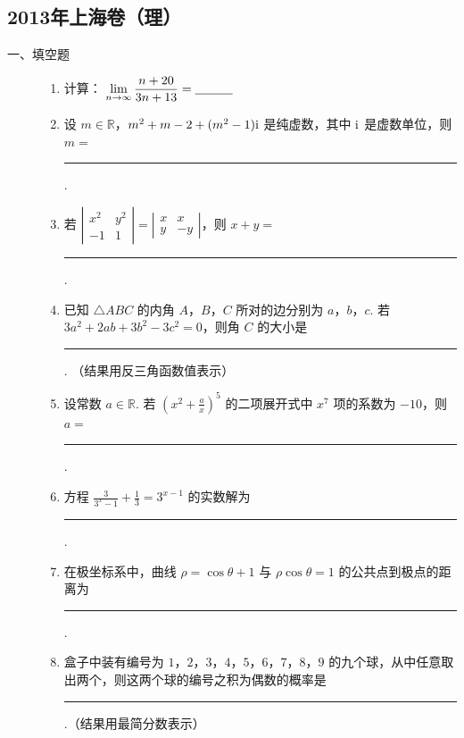 \subsection{2013年上海卷（理）}\label{gk:2013年上海卷（理）}

\begin{description}

    \item[一、填空题]

    \begin{enumerate}[leftmargin=5pt]

        \item 计算： \(\displaystyle\lim_{n\to\infty}\frac{n+20}{3n+13}=\rule[-0.3ex]{3em}{0.4pt}\)

        \item 设 \(m \in \mathbb{R}\)，\(m^2 + m - 2 + (m^2 - 1)\mathrm{i}\) 是纯虚数，其中 \(\mathrm{i}\) 是虚数单位，则 \(m=\)\rule[-0.3ex]{3em}{0.4pt}.

        \item 若 \(\left|\begin{matrix}x^2 & y^2 \\ -1 & 1\end{matrix}\right| = \left|\begin{matrix}x & x \\ y & -y\end{matrix}\right|\)，则 \(x+y=\)\rule[-0.3ex]{3em}{0.4pt}.

        \item 已知 \(\triangle ABC\) 的内角 \(A\)，\(B\)，\(C\) 所对的边分别为 \(a\)，\(b\)，\(c\). 若 \(3a^2+2ab+3b^2-3c^2=0\)，则角 \(C\) 的大小是\rule[-0.3ex]{3em}{0.4pt}. （结果用反三角函数值表示）

        \item 设常数 \(a \in \mathbb{R}\). 若 \(\left(x^2+\frac{a}{x}\right)^5\) 的二项展开式中 \(x^7\) 项的系数为 \(-10\)，则 \(a=\)\rule[-0.3ex]{3em}{0.4pt}.

        \item 方程 \(\frac{3}{3^x-1}+\frac{1}{3}=3^{x-1}\) 的实数解为\rule[-0.3ex]{3em}{0.4pt}.

        \item 在极坐标系中，曲线 \(\rho=\cos\theta+1\) 与 \(\rho\cos\theta=1\) 的公共点到极点的距离为\rule[-0.3ex]{3em}{0.4pt}.

        \item 盒子中装有编号为 \(1\)，\(2\)，\(3\)，\(4\)，\(5\)，\(6\)，\(7\)，\(8\)，\(9\) 的九个球，从中任意取出两个，则这两个球的编号之积为偶数的概率是\rule[-0.3ex]{3em}{0.4pt}.（结果用最简分数表示）


\end{enumerate}
\end{description}
